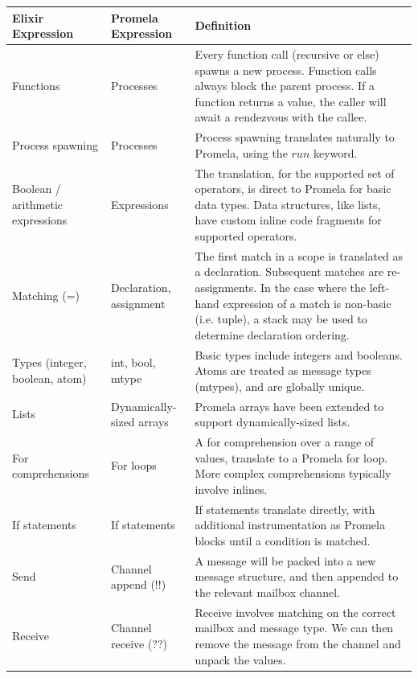 \begin{longtable}{|>{\raggedright\arraybackslash}p{4cm}|>{\raggedright\arraybackslash}p{4cm}|>{\raggedright\arraybackslash}p{6cm}|}
    \hline
        \textbf{Elixir Expression} & \textbf{Promela Expression} & \textbf{Definition} \\
        \hline
        Functions & Processes & Every function call (recursive or else) spawns a new process. Function calls always block the parent process. If a function returns a value, the caller will await a rendezvous with the callee. \\
        \hline
        Process spawning & Processes & Process spawning translates naturally to Promela, using the $run$ keyword. \\
        \hline
        Boolean / arithmetic expressions & Expressions & The translation, for the supported set of operators, is direct to Promela for basic data types. Data structures, like lists, have custom inline code fragments for supported operators. \\
        \hline
        Matching (=) & Declaration, assignment & The first match in a scope is translated as a declaration. Subsequent matches are re-assignments. In the case where the left-hand expression of a match is non-basic (i.e. tuple), a stack may be used to determine declaration ordering. \\
        \hline
        Types (integer, boolean, atom) & int, bool, mtype & Basic types include integers and booleans. Atoms are treated as message types (mtypes), and are globally unique. \\
        \hline
        Lists & Dynamically-sized arrays & Promela arrays have been extended to support dynamically-sized lists. \\
        \hline
        For comprehensions & For loops &  A for comprehension over a range of values, translate to a Promela for loop. More complex comprehensions typically involve inlines. \\
        \hline
        If statements & If statements & If statements translate directly, with additional instrumentation as Promela blocks until a condition is matched. \\
        \hline
        Send & Channel append (!!) & A message will be packed into a new message structure, and then appended to the relevant mailbox channel. \\
        \hline
        Receive & Channel receive (??) & Receive involves matching on the correct mailbox and message type. We can then remove the message from the channel and unpack the values. \\

\end{longtable}
